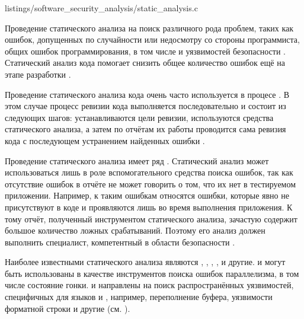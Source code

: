 	{listings/software_security_analysis/static_analysis.c}

%
Проведение статического анализа  на поиск различного рода проблем, таких как ошибок, допущенных по случайности или недосмотру со стороны программиста, общих ошибок программирования, в том числе и уязвимостей безопасности . 
%
Статический анализ кода помогает снизить общее количество ошибок ещё на этапе разработки 
.

%
Проведение статического анализа кода очень часто используется в процесе . 
%
В этом случае процесс ревизии кода выполняется последовательно и состоит из следующих шагов: устанавливаются цели ревизии, используются средства статического анализа, а затем по отчётам их работы проводится сама ревизия кода с последующем устранением найденных ошибки . 

%
Проведение статического анализа имеет ряд   . 
%
Статический анализ может использоваться лишь в роле вспомогательного средства поиска ошибок, так как отсутствие ошибок в отчёте не может говорить о том, что их нет в тестируемом приложении. 
%
Например, к таким ошибкам относятся ошибки, которые явно не присутствуют в коде и проявляются лишь во время выполнения приложения. 
%
К тому отчёт, полученный инструментом статического анализа, зачастую содержит большое количество ложных срабатываний. 
%
Поэтому его анализ должен выполнить специалист, компетентный в области безопасности .

%
Наиболее известными  статического анализа являются  ,  ,  ,  ,   и другие. 
%
 и  могут быть использованы в качестве инструментов поиска ошибок параллелизма, в том числе состояние гонки. 
%
 и  направлены на поиск распространённых уязвимостей, специфичных для языков  и , например, переполнение буфера, уязвимости форматной строки и другие (см. ).


